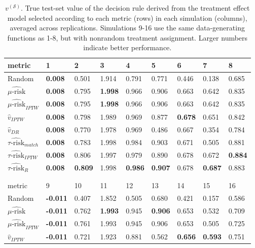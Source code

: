 \begin{table}[ht]
\centering
\caption{$v^{(\mathcal{S})}$. True test-set value of the decision rule derived from the treatment effect model selected according to each metric (rows) in each simulation (columns), averaged across replications. Simulations 9-16 use the same data-generating functions as 1-8, but with nonrandom treatment assignment. Larger numbers indicate better performance.}
\begin{tabular}{lllllllll}
  \hline
metric & 1 & 2 & 3 & 4 & 5 & 6 & 7 & 8 \\ 
  \hline
Random & \bfseries{0.008} & 0.501 & 1.914 & 0.791 & 0.771 & 0.446 & 0.138 & 0.685 \\ 
  $\widehat{\mu\text{-risk}}$ & \bfseries{0.008} & 0.795 & \bfseries{1.998} & 0.966 & 0.906 & 0.663 & 0.642 & 0.835 \\ 
  $\widehat{\mu\text{-risk}}_{IPTW}$ & \bfseries{0.008} & 0.795 & \bfseries{1.998} & 0.966 & 0.906 & 0.663 & 0.642 & 0.835 \\ 
  $\hat v_{IPTW}$ & \bfseries{0.008} & 0.798 & 1.989 & 0.969 & 0.877 & \bfseries{0.678} & 0.651 & 0.842 \\ 
  $\hat v_{DR}$ & \bfseries{0.008} & 0.770 & 1.978 & 0.969 & 0.486 & 0.667 & 0.354 & 0.784 \\ 
  $\widehat{\tau\text{-risk}}_{match}$ & \bfseries{0.008} & 0.783 & 1.998 & 0.984 & 0.903 & 0.671 & 0.505 & 0.881 \\ 
  $\widehat{\tau\text{-risk}}_{IPTW}$ & \bfseries{0.008} & 0.806 & 1.997 & 0.979 & 0.890 & 0.678 & 0.672 & \bfseries{0.884} \\ 
  $\widehat{\tau\text{-risk}}_{R}$ & \bfseries{0.008} & \bfseries{0.809} & 1.998 & \bfseries{0.986} & \bfseries{0.907} & 0.678 & \bfseries{0.687} & 0.883 \\ 
  \hline
   \\
  \\
  \hline
metric & 9 & 10 & 11 & 12 & 13 & 14 & 15 & 16 \\ 
  \hline
Random & \bfseries{-0.011} & 0.407 & 1.852 & 0.505 & 0.680 & 0.421 & 0.157 & 0.586 \\ 
  $\widehat{\mu\text{-risk}}$ & \bfseries{-0.011} & 0.762 & \bfseries{1.993} & 0.945 & \bfseries{0.906} & 0.653 & 0.532 & 0.709 \\ 
  $\widehat{\mu\text{-risk}}_{IPTW}$ & \bfseries{-0.011} & 0.761 & 1.993 & 0.945 & 0.906 & 0.653 & 0.505 & 0.725 \\ 
  $\hat v_{IPTW}$ & \bfseries{-0.011} & 0.721 & 1.923 & 0.881 & 0.562 & \bfseries{0.656} & \bfseries{0.593} & 0.751 \\ 

\end{tabular}
\end{table}
